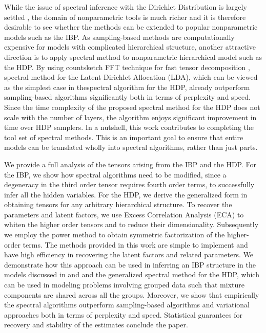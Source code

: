 \documentclass[twoside,11pt]{article}
\begin{document}
While the issue of spectral inference with the Dirichlet Distribution is
largely settled \citep{AnaGeHsuKakTel12, AnaGeHsuKak13}, the domain of
nonparametric tools is much richer and it is therefore desirable to
see whether the methods can be extended to popular nonparametric models 
such as the IBP. As sampling-based methods are computationally 
expensive for models with complicated hierarchical structure, another attractive 
direction is to apply spectral method to nonparametric hierarchical model such 
as the HDP. 
By using countsketch FFT technique for fast tensor decomposition
\citep{WanTunSmoAna15}, spectral method for the Latent Dirichlet Allocation (LDA), which can be viewed as the simplest case in thespectral algorithm for the HDP, already outperform sampling-based algorithms significantly both in terms of perplexity and speed.
Since the time complexity of the proposed spectral method for the HDP
does not scale with the number of layers, the algorithm enjoys
significant improvement in time over HDP samplers. In a nutshell, this work 
contributes to completing the tool set of spectral methods.
This is an important goal to ensure that entire models can be
translated wholly into spectral algorithms, rather than just parts.


 We provide a full analysis of the tensors arising from the IBP and the HDP. 
 For the IBP, we show how spectral algorithms need to be modified, since a 
 degeneracy in the third order tensor requires fourth order terms, to
 successfully infer all the hidden variables.
 For the HDP, we derive the generalized form in obtaining tensors for any 
 arbitrary hierarchical structure. To recover the
parameters and latent factors, we use Excess Correlation Analysis
(ECA) \citep{AnaFosHsuKakLiu12} to whiten the higher order tensors and
to reduce their dimensionality. Subsequently we employ the power
method to obtain symmetric factorization of the higher-order
terms. The methods provided in this work are simple to implement and have
high efficiency in recovering the latent factors and related
parameters. We demonstrate how this approach can be used in inferring
an IBP structure in the models discussed in \cite{GriGha11} and
\cite{KnoGha07} and the generalized spectral method for the HDP, which can 
be used in modeling problems involving grouped data such that mixture 
components are shared across all the groups.
Moreover, we show that empirically the spectral algorithms
outperform sampling-based algorithms and variational approaches
both in terms of perplexity and speed. Statistical guarantees for recovery and
stability of the estimates conclude the paper. 
\end{document}
